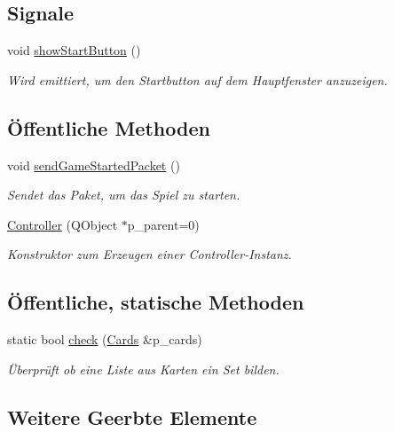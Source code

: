 \subsection*{Signale}
\begin{DoxyCompactItemize}
\item 
void \hyperlink{class_controller_a7b451f4eb09398e825910d02e73f8789}{show\+Start\+Button} ()
\begin{DoxyCompactList}\small\item\em Wird emittiert, um den Startbutton auf dem Hauptfenster anzuzeigen. \end{DoxyCompactList}\end{DoxyCompactItemize}
\subsection*{Öffentliche Methoden}
\begin{DoxyCompactItemize}
\item 
void \hyperlink{class_controller_a07ee1874817ee0abd630e846e7b37ea9}{send\+Game\+Started\+Packet} ()
\begin{DoxyCompactList}\small\item\em Sendet das Paket, um das Spiel zu starten. \end{DoxyCompactList}\item 
\hyperlink{class_controller_aa3d04afa037846c8eea68ccb37159760}{Controller} (Q\+Object $\ast$p\+\_\+parent=0)
\begin{DoxyCompactList}\small\item\em Konstruktor zum Erzeugen einer Controller-\/\+Instanz. \end{DoxyCompactList}\end{DoxyCompactItemize}
\subsection*{Öffentliche, statische Methoden}
\begin{DoxyCompactItemize}
\item 
static bool \hyperlink{class_controller_a631b306cacf6c59b6185152f8ea25fa3}{check} (\hyperlink{class_server_a2b2ff2c4678bdca3599c3feb5efdaff7}{Cards} \&p\+\_\+cards)
\begin{DoxyCompactList}\small\item\em Überprüft ob eine Liste aus Karten ein Set bilden. \end{DoxyCompactList}\end{DoxyCompactItemize}
\subsection*{Weitere Geerbte Elemente}


